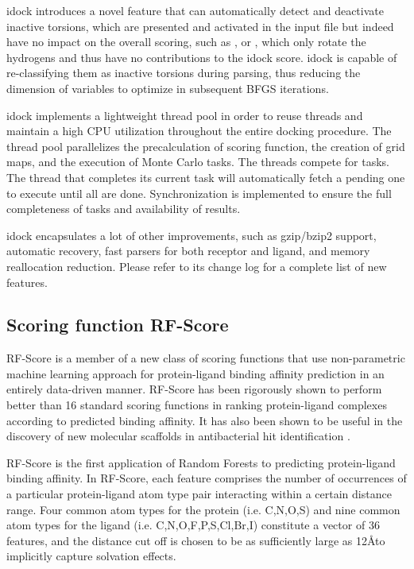 \documentclass[10pt]{article}
\begin{document}
idock introduces a novel feature that can automatically detect and deactivate inactive torsions, which are presented and activated in the input file but indeed have no impact on the overall scoring, such as ,  or , which only rotate the hydrogens and thus have no contributions to the idock score. idock is capable of re-classifying them as inactive torsions during parsing, thus reducing the dimension of variables to optimize in subsequent BFGS iterations.

idock implements a lightweight thread pool in order to reuse threads and maintain a high CPU utilization throughout the entire docking procedure. The thread pool parallelizes the precalculation of scoring function, the creation of grid maps, and the execution of Monte Carlo tasks. The threads compete for tasks. The thread that completes its current task will automatically fetch a pending one to execute until all are done. Synchronization is implemented to ensure the full completeness of tasks and availability of results.

idock encapsulates a lot of other improvements, such as gzip/bzip2 support, automatic recovery, fast parsers for both receptor and ligand, and memory reallocation reduction. Please refer to its change log for a complete list of new features.

\subsection*{Scoring function RF-Score}
RF-Score \cite{564} is a member of a new class of scoring functions that use non-parametric machine learning approach for protein-ligand binding affinity prediction in an entirely data-driven manner. RF-Score has been rigorously shown \cite{564,908} to perform better than 16 standard scoring functions in ranking protein-ligand complexes according to predicted binding affinity. It has also been shown to be useful in the discovery of new molecular scaffolds in antibacterial hit identification \cite{1281}.

RF-Score is the first application of Random Forests \cite{1309} to predicting protein-ligand binding affinity. In RF-Score, each feature comprises the number of occurrences of a particular protein-ligand atom type pair interacting within a certain distance range. Four common atom types for the protein (i.e. C,N,O,S) and nine common atom types for the ligand (i.e. C,N,O,F,P,S,Cl,Br,I) constitute a vector of 36 features, and the distance cut off is chosen to be as sufficiently large as 12\AA to implicitly capture solvation effects.
\end{document}
